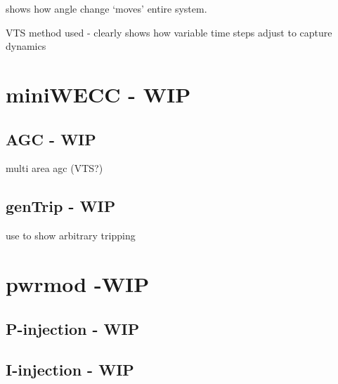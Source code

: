 shows how angle change `moves' entire system.

VTS method used - clearly shows how variable time steps adjust to capture dynamics


\pagebreak
\section{miniWECC - WIP}

	\subsection{AGC - WIP} 
multi area agc (VTS?)

	\subsection{genTrip - WIP} 
use to show arbitrary tripping


\pagebreak
\section{pwrmod -WIP} \label{sec: pwrmodExamples}
\subsection{P-injection - WIP}
\subsection{I-injection - WIP}

\pagebreak

